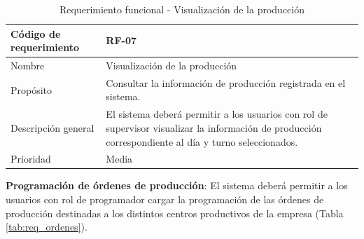 \begin{table}[H]
    \centering
    \caption{Requerimiento funcional - Visualización de la producción}
    \label{tab:req_visualizacion}
    \begin{tabularx}{\textwidth}{|X|X|}
        \hline
        Código de requerimiento & RF-07                                                                                                                                                 \\ \hline
        Nombre                  & Visualización de la producción                                                                                                                        \\ \hline
        Propósito               & Consultar la información de producción registrada en el sistema.                                                                                      \\ \hline
        Descripción general     & El sistema deberá permitir a los usuarios con rol de supervisor visualizar la información de producción correspondiente al día y turno seleccionados. \\ \hline
        Prioridad               & Media                                                                                                                                                 \\ \hline
    \end{tabularx}
\end{table}


\textbf{Programación de órdenes de producción}: El sistema deberá permitir a los usuarios con rol de programador cargar la programación de las órdenes de producción destinadas a los distintos centros productivos de la empresa (Tabla \ref{tab:req_ordenes}).

